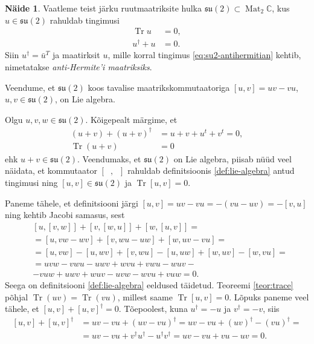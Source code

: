 \documentclass[12pt]{article}
\theoremstyle{plain}
\theoremstyle{definition}
\newtheorem{naide}{Näide}[section]
\numberwithin{equation}{section}
\def\C{{\mathbb C}}
\def\su2{{\mathfrak{ su}\left(2\right)}}
\DeclareMathOperator{\Mat}{Mat}
\DeclareMathOperator{\Tr}{Tr}
\begin{document}
\begin{naide} \label{naide:su2}
Vaatleme teist järku ruutmaatriksite hulka $\su2 \subset \Mat_2 \C$, 
kus $u \in \su2$ rahuldab tingimusi
\begin{align}
\Tr u &= 0, \label{eq:su2-tr=0}\\ 
u^\dag + u &= 0. \label{eq:su2-antihermitian}
\end{align}
Siin $u^\dag = \bar{u}^T$ ja maatirksit $u$, mille korral tingimus 
\ref{eq:su2-antihermitian} kehtib, nimetatakse \emph{anti-Hermite'i 
maatriksiks}.
 
Veendume, et $\su2$ koos tavalise maatrikskommutaatoriga 
$\left[u,v\right] = uv - vu$, $u, v \in \su2$, on Lie algebra.

Olgu $u, v, w \in \su2$. Kõigepealt märgime, et 
\begin{align*}
\left(u + v\right) + \left(u + v\right)^\dag &= 
u + v + u^t + v^t = 0, \\
\Tr \left(u + v\right) &= 0
\end{align*}
ehk $u + v \in \su2$. Veendumaks, et $\su2$ on Lie algebra, piisab 
nüüd veel näidata, et kommutaator $\left[\phantom{u}, 
\phantom{u}\right]$ rahuldab definitsioonis \ref{def:lie-algebra} 
antud tingimusi ning $\left[u,v\right] \in \su2$ ja 
$\Tr \left[u,v\right] = 0$. 

Paneme tähele, et definitsiooni järgi $\left[u,v\right] = 
uv - vu = - \left(vu - uv\right) = - \left[v,u\right]$ ning 
kehtib Jacobi samasus, sest
\begin{align*}
&\left[u, \left[v, w\right]\right] + 
	\left[v, \left[w, u\right]\right] + 
	\left[w, \left[u, v\right]\right] = \\
&= \left[u, vw - wv \right] + 
	\left[v, wu - uw \right] + 
	\left[w, uv - vu \right] = \\
&= \left[u, vw\right] - \left[u, wv\right] + 
	\left[v, wu\right] - \left[u, uw\right] + 
	\left[w, uv\right] - \left[w, vu\right] = \\
&= uvw - vwu - uwv + wvu + vwu - wuv - \\
&- vuw + uwv + wuv - uvw - wvu + vuw = 0.
\end{align*}
Seega on definitsiooni \ref{def:lie-algebra} eeldused täidetud. 
Teoreemi \ref{teor:trace} põhjal $\Tr \left(uv\right) = 
\Tr \left(vu\right)$, millest saame $\Tr \left[u,v\right] = 0$. 
Lõpuks paneme veel tähele, et $\left[u,v\right] + 
\left[u,v\right]^\dag = 0$. Tõepoolest, kuna $u^\dag = -u$ ja 
$v^\dag = -v$, siis
\begin{align*}
\left[u,v\right] + \left[u,v\right]^\dag &= uv - vu + 
\left(uv - vu\right)^\dag = uv - vu + \left(uv\right)^\dag - 
\left(vu\right)^\dag = \\
&= uv - vu + v^\dag u^\dag - u^\dag v^\dag = uv - vu + vu - uv = 0.
\end{align*}
\end{naide}
\end{document}
